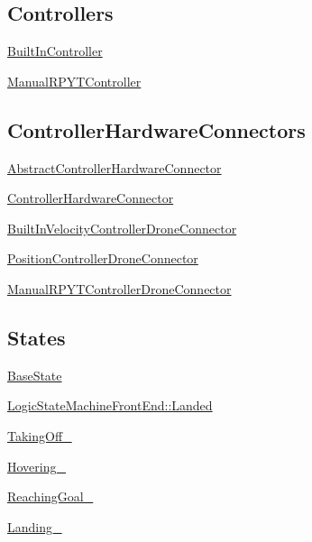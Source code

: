 \subsection*{Controllers}


\begin{DoxyItemize}
\item \hyperlink{classBuiltInController}{Built\-In\-Controller}
\item \hyperlink{classManualRPYTController}{Manual\-R\-P\-Y\-T\-Controller}
\end{DoxyItemize}

\subsection*{Controller\-Hardware\-Connectors}


\begin{DoxyItemize}
\item \hyperlink{structAbstractControllerHardwareConnector}{Abstract\-Controller\-Hardware\-Connector}
\begin{DoxyItemize}
\item \hyperlink{classControllerHardwareConnector}{Controller\-Hardware\-Connector}
\begin{DoxyItemize}
\item \hyperlink{classBuiltInVelocityControllerDroneConnector}{Built\-In\-Velocity\-Controller\-Drone\-Connector}
\item \hyperlink{classPositionControllerDroneConnector}{Position\-Controller\-Drone\-Connector}
\item \hyperlink{classManualRPYTControllerDroneConnector}{Manual\-R\-P\-Y\-T\-Controller\-Drone\-Connector}
\end{DoxyItemize}
\end{DoxyItemize}
\end{DoxyItemize}

\subsection*{States}


\begin{DoxyItemize}
\item \hyperlink{classBaseState}{Base\-State}
\begin{DoxyItemize}
\item \hyperlink{structLogicStateMachineFrontEnd_1_1Landed}{Logic\-State\-Machine\-Front\-End\-::\-Landed}
\item \hyperlink{takeoff__functors_8h_ab6710f3cb12b7653eedcd3a2215d3228}{Taking\-Off\-\_\-}
\item \hyperlink{hovering__functors_8h_a4252f403b3bcd2a850cf271512d9c6ff}{Hovering\-\_\-}
\item \hyperlink{position__control__functors_8h_af380346c24b534da18813f70217ea50f}{Reaching\-Goal\-\_\-}
\item \hyperlink{land__functors_8h_a84627965433a60de431758bddec005c3}{Landing\-\_\-}
\end{DoxyItemize}
\end{DoxyItemize}

